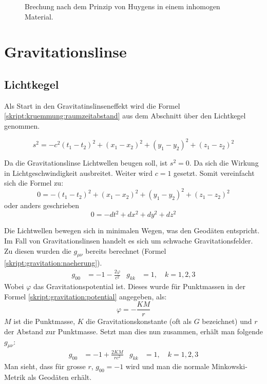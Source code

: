 \begin{refsection}
\begin{figure}
  \centering
  
  \caption{Brechung nach dem Prinzip von Huygens in einem inhomogen
    Material.}
  \label{fig:huygens3}
\end{figure}


\section{Gravitationslinse}

\subsection{Lichtkegel}
Als Start in den Gravitatinslinseneffekt wird die Formel
\ref{skript:kruemmung:raumzeitabstand} aus dem Abschnitt über den
Lichtkegel genommen.

\begin{equation*}
  s^2 = -c^2 (t_1-t_2)^2 + (x_1-x_2)^2 + (y_1-y_2)^2 + (z_1-z_2)^2
\end{equation*}

Da die Gravitationslinse Lichtwellen beugen soll, ist \(s^2=0\).  Da
sich die Wirkung in Lichtgeschwindigkeit ausbreitet.  Weiter wird
\(c=1\) gesetzt.  Somit vereinfacht sich die Formel zu:
\begin{equation*}
  0 = -(t_1-t_2)^2 + (x_1-x_2)^2 + (y_1-y_2)^2 + (z_1-z_2)^2
\end{equation*}
oder anders geschrieben
\begin{equation*}
  0 = -dt^2 + dx^2 + dy^2 + dz^2
\end{equation*}

Die Lichtwellen bewegen sich in minimalen Wegen, was den Geodäten
entspricht.  Im Fall von Gravitationslinsen handelt es sich um
schwache Gravitationsfelder.  Zu diesen wurden die \(g_{\mu\nu}\)
bereits berechnet (Formel \ref{skript:gravitation:naeherung}).
\begin{align*}
  g_{00} &= -1 -\frac{2\varphi}{c^2} &g_{kk} &= 1,\quad k=1,2,3
\end{align*}
Wobei \(\varphi\) das Gravitationspotential ist.  Dieses wurde für
Punktmassen in der Formel \ref{skript:gravitation:potential}
angegeben, als:
\begin{equation*}
  \varphi = -\frac{KM}{r}
\end{equation*}
\(M\) ist die Punktmasse, \(K\) die Gravitationskonstante
(oft als \(G\) bezeichnet) und \(r\) der Abstand zur Punktmasse.
Setzt man dies nun zusammen, erhält man folgende \(g_{\mu\nu}\):
\begin{align*}
  g_{00} &= -1 +\frac{2KM}{rc^2} &g_{kk} &= 1,\quad k=1,2,3
\end{align*}
Man sieht, dass für grosse \(r\), \(g_{00}=-1\) wird und man die
normale Minkowski-Metrik als Geodäten erhält.


\end{refsection}
